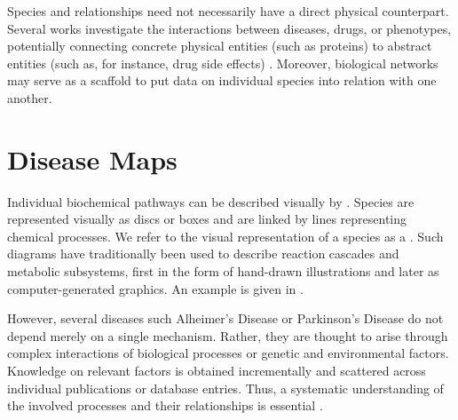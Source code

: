 \documentclass[
	fontsize=10pt, %
	twoside=false, %
	secnumdepth=1, %
  toc=indentunnumbered %
]{kaobook}
\begin{document}
Species and relationships need not necessarily have a direct physical
counterpart. Several works investigate the interactions between diseases, drugs,
or phenotypes, potentially connecting concrete physical entities (such as
proteins) to abstract entities (such as, for instance, drug side effects)
\cite{ruiz_identification_2021, barabasi_NetworkMedicineNetworkbased_2011}.
Moreover, biological networks
may serve
as a scaffold to put data on individual species into relation with one another.

\section{Disease Maps}


Individual biochemical pathways can be described visually by . Species are represented visually as discs or boxes and
are linked by lines representing chemical processes.
We refer to the visual representation of a species as a .
Such diagrams have traditionally been
used to describe reaction cascades and metabolic subsystems, first in the form
of hand-drawn illustrations and later as computer-generated graphics.
An example is given in
. 

However, several diseases such Alheimer's Disease or Parkinson's Disease do not depend
merely on a single mechanism. Rather, they are thought to arise through complex
interactions of biological processes or genetic and environmental factors.
Knowledge on relevant factors is obtained incrementally and scattered across
individual publications or database entries.
Thus, a systematic understanding of the involved processes and their
relationships is essential
\cite{ostaszewski_CommunitydrivenRoadmapIntegrated_2019,
  mazein_SystemsMedicineDisease_2018}.
% 
\end{document}
